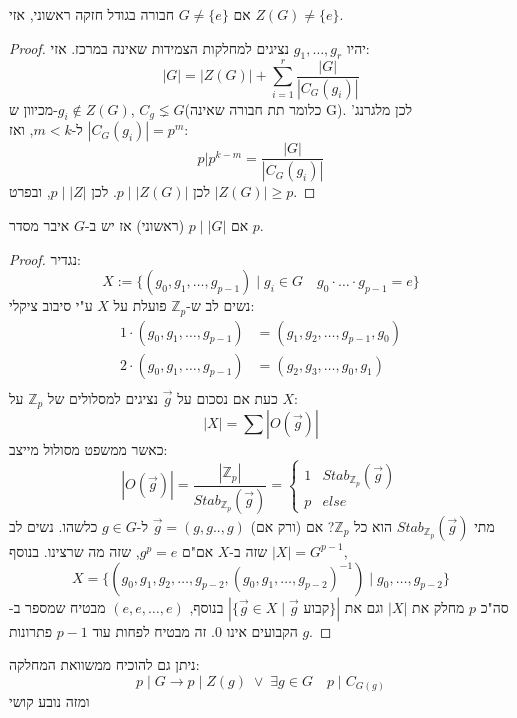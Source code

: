 \documentclass{tstextbook}
\begin{document}
\begin{proposition}
אם \(G\neq \{ e \}\) חבורה בגודל חזקה ראשוני, אזי \(Z(G)\neq \{ e \}\).

\end{proposition}
\begin{proof}
יהיו \(g_{1},\dots,g_{r}\) נציגים למחלקות הצמידות שאינה במרכז.
אזי:
$$|G|=|Z(G)|+\sum_{i=1}^r \frac{|G|}{|C_{G}(g_{i})|}$$
מכיוון ש-\(g_{i}\not\in Z(G)\), \(C_{g}\lneq G\)(כלומר תת חבורה שאינה G).
לכן מלגרנג' \(|C_{G}(g_{i})|=p^m\) ל-\(m<k\), ואז:
$$p|p^{k-m}=\frac{|G|}{|C_{G}(g_{i})|}$$
לכן \(p\;\big|\;|Z(G)|\).
לכן \(p\;\big|\;|Z|\), ובפרט \(|Z(G)|\geq p\).

\end{proof}
\begin{theorem}[קושי]
אם \(p\;\big|\;|G|\) (ראשוני) אז יש ב-\(G\) איבר מסדר \(p\).

\end{theorem}
\begin{proof}
נגדיר:
$$X:=\{ (g_{0},g_{1},\dots,g_{p-1})\;\Big| \;g_{i}\in G\quad g_{0}\cdot \dots\cdot g_{p-1}=e \}$$
נשים לב ש-\(\mathbb{Z}_{p}\) פועלת על \(X\) ע"י סיבוב ציקלי:
$$\begin{align}1\cdot (g_{0},g_{1},\dots,g_{p-1})&=(g_{1},g_{2},\dots,g_{p-1},g_{0}) \\2\cdot (g_{0},g_{1},\dots,g_{p-1})&=(g_{2},g_{3},\dots,g_{0},g_{1}) \\
\end{align}$$
כעת אם נסכום על \(\vec{g}\) נציגים למסלולים של \(\mathbb{Z} _{p}\) על \(X\):
$$|X|=\sum|O(\vec{g})|$$
כאשר ממשפט מסולול מייצב:
$$|O(\vec{g})|=\frac{|\mathbb{Z} _{p}|}{Stab_{\mathbb{Z} _{p}}(\vec{g})}=\begin{cases}1  & Stab_{\mathbb{Z} _{p}}(\vec{g}) \\p & else
\end{cases}$$
מתי \(Stab_{\mathbb{Z} _{p}}(\vec{g})\) הוא כל \(\mathbb{Z}_p\)? אם (ורק אם) \(\vec{g}=(g,g..,g)\) ל-\(g\in G\) כלשהו. נשים לב שזה ב-\(X\) אם"ם \(g^p=e\), שזה מה שרצינו.
בנוסף \(|X|=G^{p-1}\),
$$X=\{ (g_{0},g_{1},g_{2},\dots,g_{p-2}, (g_{0},g_{1},\dots,g_{p-2})^{-1} )\;\big|\;g_{0},\dots,g_{p-2} \}$$
סה"כ \(p\) מחלק את \(|X|\) וגם את \(|\{ \vec{g}\in X\;\big|\; \vec{g}  \text{ קבוע} \}|\)
בנוסף, \((e,e, \dots,e)\) מבטיח שמספר ב-\(g\) הקבועים אינו 0.
זה מבטיח לפחות עוד \(p-1\) פתרונות.

\end{proof}
\begin{remark}
ניתן גם להוכיח ממשוואת המחלקה: 
$$p\;\big|\;G\to p\;\big|\;Z(g) \;\lor\;\exists g\in  G\quad p\;\big|\;C_{G(g)}$$
ומזה נובע קושי

\end{remark}
\end{document}
